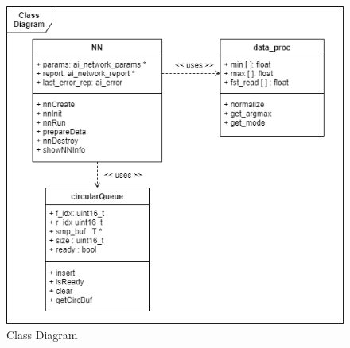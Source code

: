 \begin{center}
	\begin{figure}[H]
	\hfill\includegraphics[scale=0.4]{figures/class_diagram.png}\hspace*{\fill}
	\caption{Class Diagram}\label{fig:22}
	\end{figure}
\end{center}

